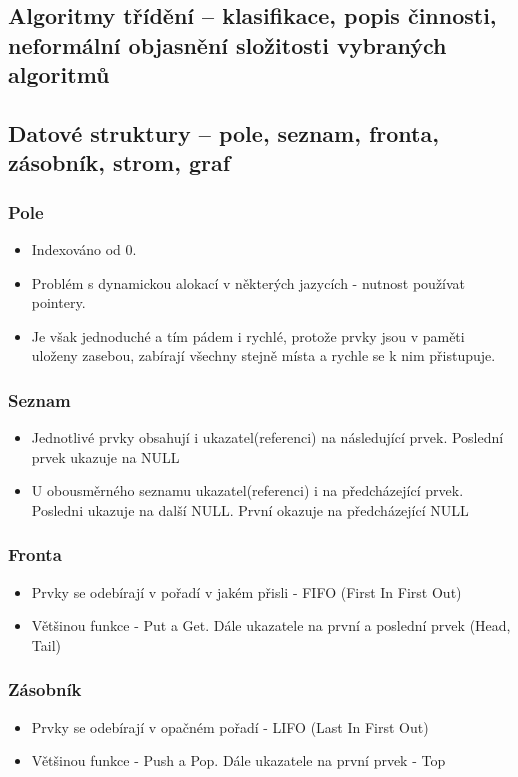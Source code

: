 \documentclass[10pt,a4paper]{article}
\begin{document}
\subsection{Algoritmy třídění – klasifikace, popis činnosti, neformální objasnění složitosti vybraných algoritmů}

\subsection{Datové struktury – pole, seznam, fronta, zásobník, strom, graf}
\subsubsection{Pole}
\begin{itemize}
\item Indexováno od 0.
\item Problém s dynamickou alokací v některých jazycích - nutnost používat pointery.
\item Je však jednoduché a tím pádem i rychlé, protože prvky jsou v paměti uloženy zasebou, zabírají všechny stejně místa a rychle se k nim přistupuje.
\end{itemize}

\subsubsection{Seznam}
\begin{itemize}
\item Jednotlivé prvky obsahují i ukazatel(referenci) na následující prvek. Poslední prvek ukazuje na NULL
\item U obousměrného seznamu ukazatel(referenci) i na předcházející prvek. Posledni ukazuje na další NULL. První okazuje na předcházející NULL
\end{itemize}

\subsubsection{Fronta}
\begin{itemize}
\item Prvky se odebírají v pořadí v jakém přisli - FIFO (First In First Out)
\item Většinou funkce - Put a Get. Dále ukazatele na první a poslední prvek (Head, Tail)
\end{itemize}

\subsubsection{Zásobník}
\begin{itemize}
\item Prvky se odebírají v opačném pořadí - LIFO (Last In First Out)
\item Většinou funkce - Push a Pop. Dále ukazatele na první prvek - Top
\end{itemize}
\end{document}

